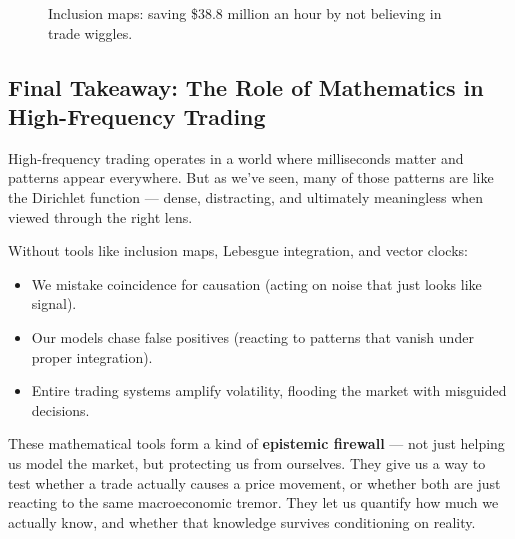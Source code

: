 \begin{figure}[H]
\centering
{}
\caption{Inclusion maps: saving \$38.8 million an hour by not believing in trade wiggles.}
\end{figure}


\subsection{Final Takeaway: The Role of Mathematics in High-Frequency Trading}

\vspace{0.5em}
High-frequency trading operates in a world where milliseconds matter and patterns appear everywhere. But as we've seen, many of those patterns are like the Dirichlet function — dense, distracting, and ultimately meaningless when viewed through the right lens.

Without tools like inclusion maps, Lebesgue integration, and vector clocks:

\begin{itemize}
    \item We mistake coincidence for causation (acting on noise that just looks like signal).
    \item Our models chase false positives (reacting to patterns that vanish under proper integration).
    \item Entire trading systems amplify volatility, flooding the market with misguided decisions.
\end{itemize}

These mathematical tools form a kind of \textbf{epistemic firewall} — not just helping us model the market, but protecting us from ourselves. They give us a way to test whether a trade actually causes a price movement, or whether both are just reacting to the same macroeconomic tremor. They let us quantify how much we actually know, and whether that knowledge survives conditioning on reality.

